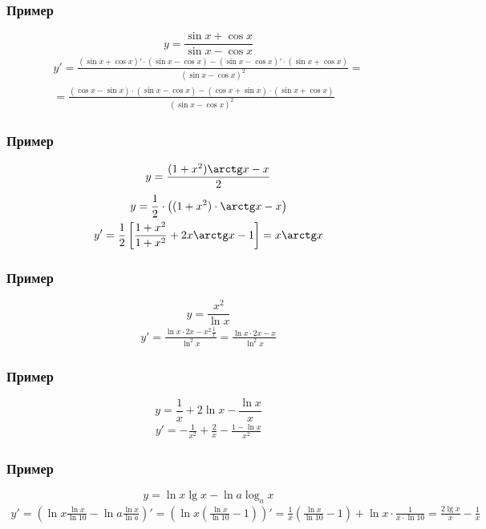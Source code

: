 \documentclass{article}
\begin{document}
\subsubsection{Пример}
\[
    y = \frac{\sin x + \cos x}{\sin x - \cos x}
\]
\begin{gather*}
    y' = \frac{(\sin x + \cos x)' \cdot (\sin x - \cos x) - (\sin x - \cos x)' \cdot (\sin x + \cos x)}{(\sin x - \cos x)^2} = \\
    = \frac{(\cos x - \sin x) \cdot (\sin x - \cos x) - (\cos x + \sin x) \cdot (\sin x + \cos x)}{(\sin x - \cos x)^2}
\end{gather*}

\subsubsection{Пример}
\[
    y = \frac{(1 + x^2) \arctg x - x}{2}
\]
\begin{gather*}
    y = \frac{1}{2} \cdot \left( (1 + x^2) \cdot \arctg x - x \right) \\
    y' = \frac{1}{2} \left[ \frac{1 + x^2}{1 + x^2} + 2x \arctg x - 1 \right] =
    x \arctg x
\end{gather*}

\subsubsection{Пример}
\[
    y = \frac{x^2}{\ln x}
\]
\begin{gather*}
    y' = \frac{\ln x \cdot 2x - x^2 \frac{1}{x}}{\ln^2 x} =
    \frac{\ln x \cdot 2x - x}{\ln^2 x}
\end{gather*}

\subsubsection{Пример}
\[
    y = \frac{1}{x} + 2 \ln x - \frac{\ln x}{x}
\]
\begin{gather*}
    y' = -\frac{1}{x^2} + \frac{2}{x} - \frac{1 - \ln x}{x^2}
\end{gather*}

\subsubsection{Пример}
\[
    y = \ln x \lg x - \ln a \log_{a} x
\]
\begin{gather*}
    y' = \left( \ln x \frac{\ln x}{\ln 10} - \ln a \frac{\ln x}{\ln a} \right)' =
    \left( \ln x \left( \frac{\ln x}{\ln 10} - 1 \right) \right)' =
    \frac{1}{x} \left( \frac{\ln x}{\ln 10} - 1 \right) + \ln x \cdot \frac{1}{x \cdot \ln 10} =
    \frac{2 \lg x}{x} - \frac{1}{x}
\end{gather*}
\end{document}
